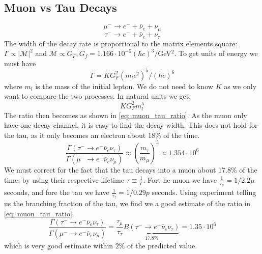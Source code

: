\subsection{Muon vs Tau Decays}
\begin{equation}
  μ^- → e^- + \bar{ν}_e + ν_μ
\end{equation}
\begin{equation}
  τ^- → e^- + \bar{ν}_e + ν_τ
\end{equation}
The width of the decay rate is proportional to the matrix elements square: $Γ \propto \left|\mathcal{M}\right|^2$ and $\mathcal{M} \propto G_{F}, G_{f} = 1.166 ⋅  10^{-5} (ℏc)^3 /$GeV$^2$. To get units of energy we must have 
\begin{equation}
  Γ = K G^2_{F}(m_lc^2)^{5} / (ℏc)^{6}
\end{equation}
where $m_l$ is the mass of the initial lepton. We do not need to know $K$ as we only want to compare the two processes. In natural units we get:
\begin{equation}
  KG^2_{F} m_l^{5}
\end{equation}
The ratio then becomes as shown in \cref{eq: muon_tau_ratio}. As the muon only have one decay channel, it is easy to find the decay width. This does not hold for the tau, as it only becomes an electron about 18\% of the time.
\begin{equation}\label{eq: muon_tau_ratio}
  \frac{Γ(τ^{-} → e^{-} \bar{ν}_e ν_{τ})}{Γ(μ^{-} → e^{-} \bar{ν}_e ν_{μ})} ≈ \left(\frac{m_τ}{m_μ}\right)^{5} ≈ 1.354 ⋅  10^{6}
\end{equation}
We must correct for the fact that the tau decays into a muon about 17.8\% of the time, by using their respective lifetime $τ ≡ \frac{1}{Γ}$. Fort he muon we have $\frac{1}{τ_{μ}} = 1 / 2.2 μ$ seconds, and fore the tau we have $\frac{1}{τ_{τ}} = 1 / 0.29 p$ seconds. Using experiment telling us the branching fraction of the tau, we find we a good estimate of the ratio in \cref{eq: muon_tau_ratio}.
\begin{equation}
  \frac{Γ(τ^{-} → e^{-} \bar{ν}_e ν_{τ})}{Γ(μ^{-} → e^{-} \bar{ν}_e ν_{μ})} = \frac{τ_{μ}}{τ_{τ}} \underbrace{B(τ^{-} → e^{-} \bar{ν}_e ν_{τ})}_{17.8 \%} = 1.35 ⋅  10^{6} 
\end{equation}
which is very good estimate within $2\%$ of the predicted value. 


